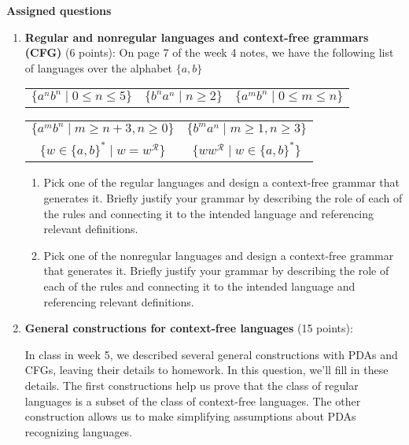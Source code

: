 {\bf Assigned questions}
\begin{enumerate}[wide, labelwidth=!, labelindent=0pt]


\item \textbf{Regular and nonregular languages and context-free grammars (CFG)} (6 points): 
On page 7 of the week 4 notes, we have the following list of languages over the alphabet $\{a,b\}$

\begin{center}
\begin{tabular}{ccc}
    $\{a^nb^n \mid 0  \leq n  \leq 5 \}$
    &$\{b^n a^n \mid  n  \geq 2\}$
    &$\{a^m b^n \mid  0 \leq m\leq n\}$
\end{tabular}
\begin{tabular}{cc}
    $\{a^m b^n \mid  m \geq n+3,  n \geq 0\}$
    &$\{b^m a^n \mid  m \geq 1, n \geq  3\}$\\
    $\{ w  \in \{a,b\}^* \mid w = w^\mathcal{R} \}$
    &$\{ ww^\mathcal{R} \mid w\in \{a,b\}^* \}$ \\
\end{tabular}
\end{center}
\begin{enumerate}
    \item\gradeCompleteFirst Pick one of the regular languages and design a context-free grammar that generates it. 
    Briefly justify your grammar by describing the role of each of the rules
    and connecting it to the intended language and referencing relevant definitions.
    \item\gradeComplete Pick one of the nonregular languages and design a context-free grammar that generates it.  Briefly justify your grammar by describing the role of each of the rules
    and connecting it to the intended language and referencing relevant definitions.
\end{enumerate}

\item \textbf{General constructions for context-free languages} (15 points):

In class in week 5, we described several general constructions 
with PDAs and CFGs, leaving their details to
homework. In this question, we'll fill in these details. The first constructions
help us prove that the class of regular languages is a subset of the
class of context-free languages. The other construction allows us 
to make simplifying assumptions about PDAs recognizing languages.


\end{enumerate}
